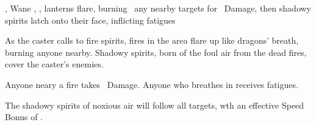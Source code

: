   {\mFire, \mAir}%
  {Wane}%
  {\detailed, \duplicated, \divergent}%
  {}%
  {lanterns flare, burning \spellArea\ any nearby targets for \rollConv\ Damage, then shadowy spirits latch onto their face, inflicting  \glspl{fatigue}}%
  {
    As the caster calls to fire spirits, fires in the area flare up like dragons' breath, burning anyone nearby.
    Shadowy spirits, born of the foul air from the dead fires, cover the caster's enemies.

    Anyone neary a fire takes \rollConv\ Damage.
    Anyone who breathes in receives  \glspl{fatigue}.

    The shadowy spirits of noxious air will follow all targets, wth an effective Speed Bonus of .
  }

